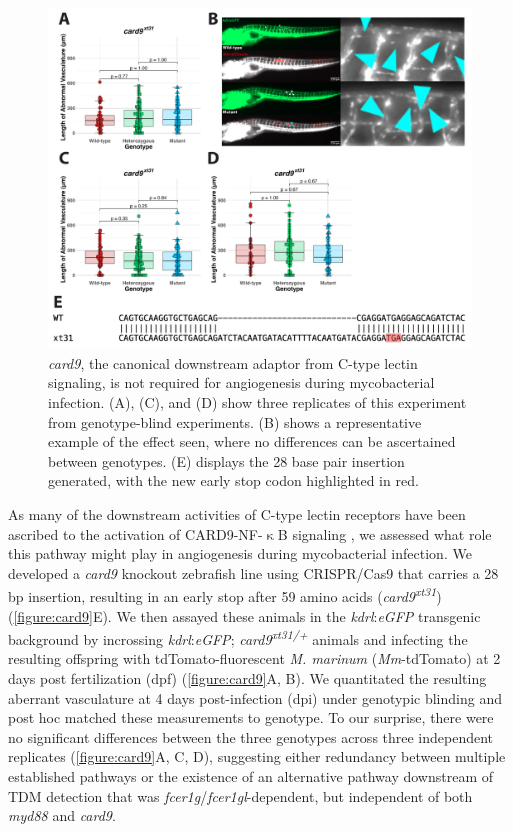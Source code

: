 \begin{figure}
\centering
\includegraphics[width=\textwidth]{images/card9.pdf}
\caption{\textit{card9}, the canonical downstream adaptor from C-type lectin signaling, is not required for angiogenesis during mycobacterial infection. (A), (C), and (D) show three replicates of this experiment from genotype-blind experiments. (B) shows a representative example of the effect seen, where no differences can be ascertained between genotypes. (E) displays the 28 base pair insertion generated, with the new early stop codon highlighted in red.}
\label{figure:card9}
\end{figure}

As many of the downstream activities of C-type lectin receptors have been ascribed to the activation of CARD9-NF-$\upkappa$B signaling \citep{Goodridge2009, LobatoPascual2013, Zhao2014, Williams2017, Deerhake2021}, we assessed what role this pathway might play in angiogenesis during mycobacterial infection. We developed a \textit{card9} knockout zebrafish line using CRISPR/Cas9 that carries a 28 bp insertion, resulting in an early stop after 59 amino acids (\textit{card9\textsuperscript{xt31}}) (\autoref{figure:card9}E). We then assayed these animals in the \textit{kdrl}:\textit{eGFP} transgenic background by incrossing \textit{kdrl}:\textit{eGFP}; \textit{card9\textsuperscript{xt31/+}} animals and infecting the resulting offspring with tdTomato-fluorescent \textit{M. marinum} (\textit{Mm}-tdTomato) at 2 days post fertilization (dpf) \citep{Jin2005, Oehlers2015}(\autoref{figure:card9}A, B). We quantitated the resulting aberrant vasculature at 4 days post-infection (dpi) under genotypic blinding and post hoc matched these measurements to genotype. To our surprise, there were no significant differences between the three genotypes across three independent replicates (\autoref{figure:card9}A, C, D), suggesting either redundancy between multiple established pathways or the existence of an alternative pathway downstream of TDM detection that was \textit{fcer1g}/\textit{fcer1gl}-dependent, but independent of both \textit{myd88} and \textit{card9}. 


